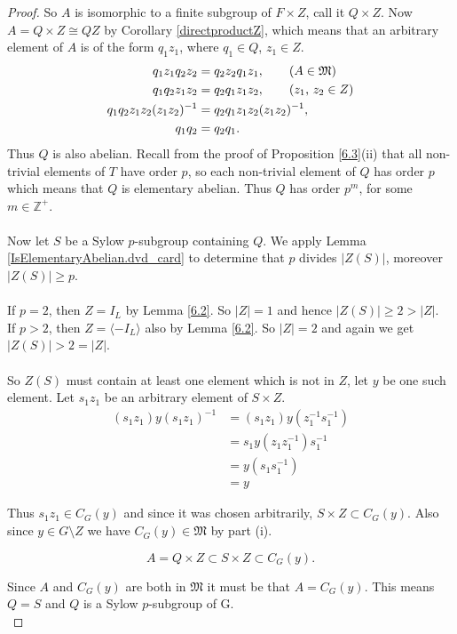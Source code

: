 \begin{proof}
  So $A$ is isomorphic to a finite subgroup of $F \times Z$, call it $Q \times Z$. Now $A = Q \times Z \cong QZ$ by Corollary \ref{directproductZ}, which means that an arbitrary element of $A$ is of the form $q_1z_1$, where $q_1 \in Q$, $z_1 \in Z$.
  \begin{align*} q_1z_1q_2z_2 &= q_2z_2 q_1z_1, \tag{$A \in \mathfrak{M}$}
  \\ q_1q_2z_1z_2 &= q_2q_1z_1z_2, \tag{$z_1$, $z_2 \in Z$}
  \\  q_1q_2z_1z_2(z_1z_2)^{-1} &= q_2q_1z_1z_2(z_1z_2)^{-1},
  \\ q_1q_2 &= q_2q_1.
  \end{align*}
  Thus $Q$ is also abelian. Recall from the proof of Proposition \ref{6.3}(ii) that all non-trivial elements of $T$ have order $p$, so each non-trivial element of $Q$ has order $p$ which means that $Q$ is elementary abelian. Thus $Q$ has order $p^m$, for some $m \in \mathbb{Z}^+$. \\
  \\
  Now let $S$ be a Sylow $p$-subgroup containing $Q$. We apply Lemma \ref{IsElementaryAbelian.dvd_card} to determine that $p$ divides $|Z(S)|$, moreover $|Z(S)| \geq p$. \\
  \\
  If $p=2$, then $Z=I_L$ by Lemma \ref{6.2}. So $|Z| = 1$ and hence $|Z(S)| \geq 2 > |Z|$.\\
  If $p > 2$, then  $Z = \langle - I_L \rangle$ also by Lemma \ref{6.2}. So $|Z| = 2$ and again we get $|Z(S)| > 2 = |Z|$. \\
  \\
  So $Z(S)$ must contain at least one element which is not in $Z$, let $y$ be one such element. Let $s_1z_1$ be an arbitrary element of $S \times Z$.
  \begin{align*}
  (s_1z_1)y(s_1z_1)^{-1} &= (s_1z_1)y(z_1^{-1}s_1^{-1})
  \\ &= s_1y(z_1z_1^{-1})s_1^{-1} \tag{since $y \in L$, $z_1 \in Z$}
  \\ &= y(s_1s_1^{-1}) \tag{since $s_1 \in S$, $y \in Z(S)$}
  \\ &= y
  \end{align*}
  
  Thus $s_1z_1 \in C_G(y)$ and since it was chosen arbitrarily, $S \times Z \subset C_G(y)$. Also since $y \in G \! \setminus \! Z$ we have $C_G(y) \in \mathfrak{M}$ by part (i).
  
  \begin{equation*}
  A = Q \times Z \subset S \times Z \subset C_G(y).
  \end{equation*}
  
  Since $A$ and $C_G(y)$ are both in $\mathfrak{M}$ it must be that $A = C_G(y)$. This means $Q = S$ and $Q$ is a Sylow $p$-subgroup of G.\\
\end{proof}

